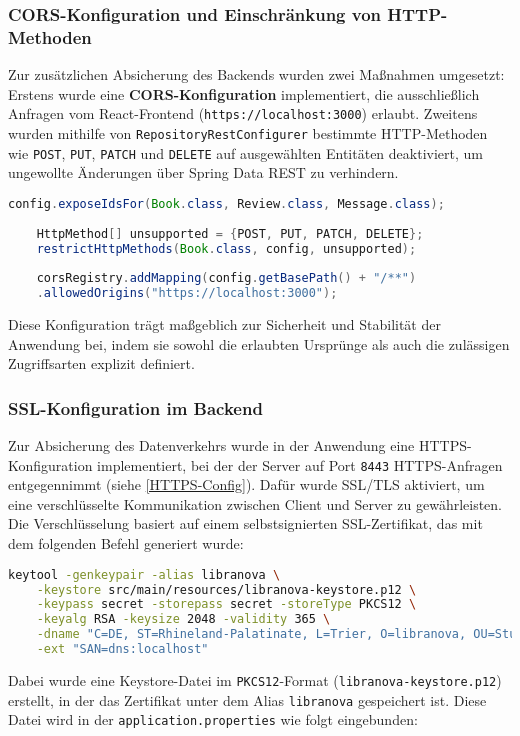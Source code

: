 \subsubsection{CORS-Konfiguration und Einschränkung von HTTP-Methoden}

Zur zusätzlichen Absicherung des Backends wurden zwei Maßnahmen umgesetzt: Erstens wurde eine \textbf{CORS-Konfiguration} implementiert, die ausschließlich Anfragen vom React-Frontend (\texttt{https://localhost:3000}) erlaubt. Zweitens wurden mithilfe von \texttt{RepositoryRestConfigurer} bestimmte HTTP-Methoden wie \texttt{POST}, \texttt{PUT}, \texttt{PATCH} und \texttt{DELETE} auf ausgewählten Entitäten deaktiviert, um ungewollte Änderungen über Spring Data REST zu verhindern.

\begin{lstlisting}[language=Java, caption={CORS und HTTP-Methodenbeschränkung}]
	config.exposeIdsFor(Book.class, Review.class, Message.class);
	
	HttpMethod[] unsupported = {POST, PUT, PATCH, DELETE};
	restrictHttpMethods(Book.class, config, unsupported);
	
	corsRegistry.addMapping(config.getBasePath() + "/**")
	.allowedOrigins("https://localhost:3000");
\end{lstlisting}
Diese Konfiguration trägt maßgeblich zur Sicherheit und Stabilität der Anwendung bei, indem sie sowohl die erlaubten Ursprünge als auch die zulässigen Zugriffsarten explizit definiert.



\subsubsection{SSL-Konfiguration im Backend}

Zur Absicherung des Datenverkehrs wurde in der Anwendung eine HTTPS-Konfiguration implementiert, bei der der Server auf Port \texttt{8443} HTTPS-Anfragen entgegennimmt (siehe \ref{HTTPS-Config}). Dafür wurde SSL/TLS aktiviert, um eine verschlüsselte Kommunikation zwischen Client und Server zu gewährleisten. \\
Die Verschlüsselung basiert auf einem selbstsignierten SSL-Zertifikat, das mit dem folgenden Befehl generiert wurde:
\begin{lstlisting}[language=bash, caption={Generierung eines SSL-Zertifikats}, breaklines=true]
	keytool -genkeypair -alias libranova \
	-keystore src/main/resources/libranova-keystore.p12 \
	-keypass secret -storepass secret -storeType PKCS12 \
	-keyalg RSA -keysize 2048 -validity 365 \
	-dname "C=DE, ST=Rhineland-Palatinate, L=Trier, O=libranova, OU=Studies Backend, CN=localhost" \
	-ext "SAN=dns:localhost"
\end{lstlisting}
Dabei wurde eine Keystore-Datei im \texttt{PKCS12}-Format (\texttt{libranova-keystore.p12}) erstellt, in der das Zertifikat unter dem Alias \texttt{libranova} gespeichert ist. Diese Datei wird in der \texttt{application.properties} wie folgt eingebunden:

